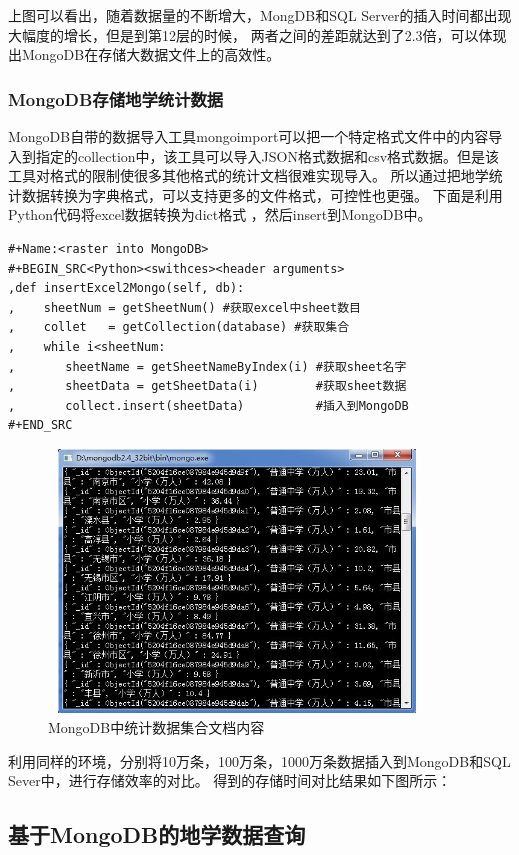 \documentclass[master]{njnuthesis}
\begin{document}
上图可以看出，随着数据量的不断增大，MongDB和SQL Server的插入时间都出现大幅度的增长，但是到第12层的时候，
两者之间的差距就达到了2.3倍，可以体现出MongoDB在存储大数据文件上的高效性。

\subsubsection{MongoDB存储地学统计数据}
MongoDB自带的数据导入工具mongoimport可以把一个特定格式文件中的内容导入到指定的collection中，该工具可以导入JSON格式数据和csv格式数据。但是该工具对格式的限制使很多其他格式的统计文档很难实现导入。
所以通过把地学统计数据转换为字典格式，可以支持更多的文件格式，可控性也更强。
下面是利用Python代码将excel数据转换为dict格式 ，然后insert到MongoDB中。

\begin{verbatim}
#+Name:<raster into MongoDB>
#+BEGIN_SRC<Python><swithces><header arguments>
,def insertExcel2Mongo(self, db):
,    sheetNum = getSheetNum() #获取excel中sheet数目
,    collet   = getCollection(database) #获取集合
,    while i<sheetNum:
,       sheetName = getSheetNameByIndex(i) #获取sheet名字
,       sheetData = getSheetData(i)        #获取sheet数据
,       collect.insert(sheetData)          #插入到MongoDB
#+END_SRC
\end{verbatim}

\begin{figure}[h]
\begin{center}
\includegraphics[angle=0,width=10cm,height=7cm]{pic//excel_data.jpg}
\caption{MongoDB中统计数据集合文档内容}
\label{fig:4}
\end{center}
\end{figure}
利用同样的环境，分别将10万条，100万条，1000万条数据插入到MongoDB和SQL Sever中，进行存储效率的对比。
得到的存储时间对比结果如下图所示：

\subsection{基于MongoDB的地学数据查询}
\end{document}
